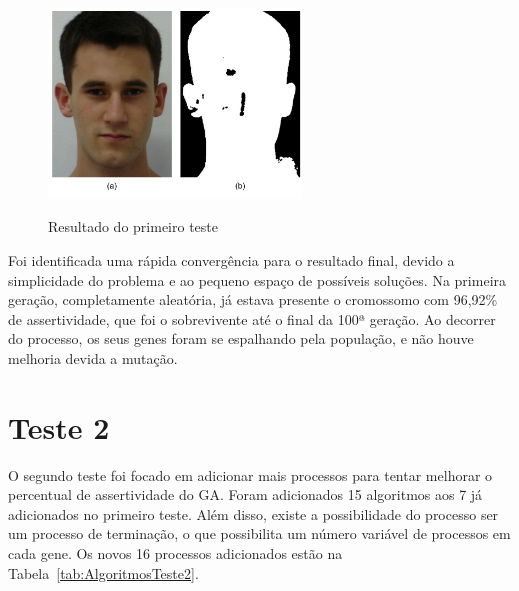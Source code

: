 \documentclass[12pt,oneside,a4paper,english,french,spanish,brazil,]{abntex2}
\begin{document}
\begin{figure}[ht]
\centering
\caption{Resultado do primeiro teste}
\includegraphics[width=0.6\textwidth]{imagens/DES_Primeiro_Teste.pdf}
\sourceAuthor
\label{fig:DES_Primeiro_Teste}
\end{figure}

Foi identificada uma rápida convergência para o resultado final, devido a simplicidade do problema e ao pequeno espaço de possíveis soluções. Na primeira geração, completamente aleatória, já estava presente o cromossomo com 96,92\% de assertividade, que foi o sobrevivente até o final da 100ª geração. Ao decorrer do processo, os seus genes foram se espalhando pela população, e não houve melhoria devida a mutação.

\section{Teste 2}

O segundo teste foi focado em adicionar mais processos para tentar melhorar o percentual de assertividade do GA. Foram adicionados 15 algoritmos aos 7 já adicionados no primeiro teste. Além disso, existe a possibilidade do processo ser um processo de terminação, o que possibilita um número variável de processos em cada gene. Os novos 16 processos adicionados estão na Tabela~\ref{tab:AlgoritmosTeste2}.
\end{document}
